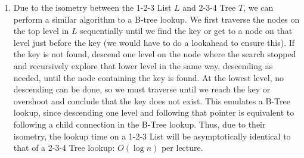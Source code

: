 \documentclass{article}
\theoremstyle{casestyle}
\begin{document}
\begin{enumerate}[i]
\item Due to the isometry between the 1-2-3 List $L$ and 2-3-4 Tree $T$, we can perform a similar algorithm to a B-tree lookup. We first traverse the nodes on the top level in $L$ sequentially until we find the key or get to a node on that level just before the key (we would have to do a lookahead to ensure this). If the key is not found, descend one level on the node where the search stopped and recursively explore that lower level in the same way, descending as needed, until the node containing the key is found. At the lowest level, no descending can be done, so we must traverse until we reach the key or overshoot and conclude that the key does not exist. This emulates a B-Tree lookup, since descending one level and following that pointer is equivalent to following a child connection in the B-Tree lookup. Thus, due to their isometry, the lookup time on a 1-2-3 List will be asymptotically identical to that of a 2-3-4 Tree lookup: $O(\log n)$ per lecture.


\end{enumerate}
\end{document}
